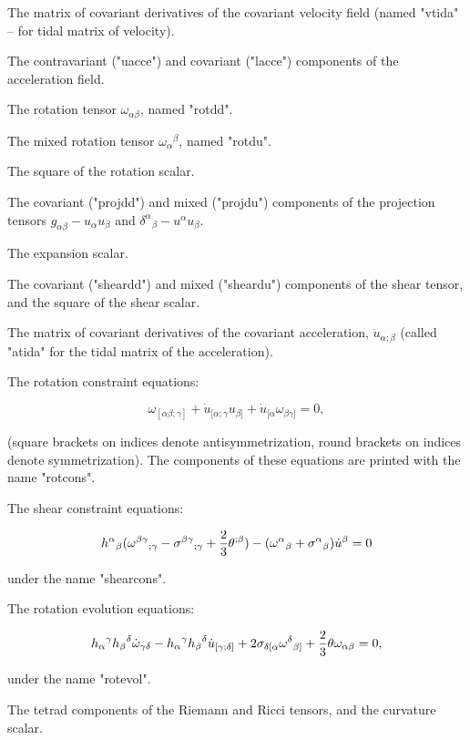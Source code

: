The matrix of covariant derivatives of the covariant velocity field (named
"vtida" -- for tidal matrix of velocity).

The contravariant ("uacce") and covariant ("lacce") components of the
acceleration field.

The rotation tensor $\omega_{\alpha \beta}$, named "rotdd".

The mixed rotation tensor ${\omega_{\alpha}}^{\beta}$, named "rotdu".

The square of the rotation scalar.

The covariant ("projdd") and mixed ("projdu") components of the projection
tensors $g_{\alpha \beta} - u_{\alpha} u_{\beta}$ and
${\delta^{\alpha}}_{\beta} - u^{\alpha} u_{\beta}$.

The expansion scalar.

The covariant ("sheardd") and mixed ("sheardu") components of the shear tensor,
and the square of the shear scalar.

The matrix of covariant derivatives of the covariant acceleration,
$\dot{u}_{\alpha ; \beta}$ (called "atida" for the tidal matrix of the
acceleration).

The rotation constraint equations:

$$ \omega_{[\alpha \beta; \gamma]} + \dot{u}_{[\alpha; \gamma}u_{\beta]} +
\dot{u}_{[\alpha}\omega_{\beta \gamma]} = 0, $$

\noindent (square brackets on indices denote antisymmetrization, round brackets
on indices denote symmetrization). The components of these equations are
printed with the name "rotcons".

The shear constraint equations:

$${h^{\alpha}}_{\beta}({\omega^{\beta \gamma}}_{;\gamma} - {\sigma^{\beta
\gamma}}_{;\gamma} + {2 \over 3} \theta^{;\beta}) - ({\omega^{\alpha}}_{\beta}
+ {\sigma^{\alpha}}_{\beta})\dot{u}^{\beta} = 0 $$

\noindent under the name "shearcons".

The rotation evolution equations:

$${h_{\alpha}}^{\gamma} {h_{\beta}}^{\delta}\dot{\omega}_{\gamma \delta} -
{h_{\alpha}}^{\gamma} {h_{\beta}}^{\delta} \dot{u}_{[\gamma; \delta]} + 2
\sigma_{\delta [\alpha} {\omega^{\delta}}_{\beta]} + {2 \over 3} \theta
\omega_{\alpha \beta} = 0, $$

\noindent under the name "rotevol".

The tetrad components of the Riemann and Ricci tensors, and the curvature
scalar.

